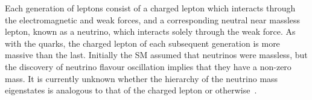 Each generation of leptons consist of a charged lepton which interacts through the electromagnetic and weak forces, and a corresponding neutral near massless lepton, known as a neutrino, which interacts solely through the weak force.
As with the quarks, the charged lepton of each subsequent generation is more massive than the last.
Initially the SM assumed that neutrinos were massless, but the discovery of neutrino flavour oscillation implies that they have a non-zero mass. 
It is currently unknown whether the hierarchy of the neutrino mass eigenstates is analogous to that of the charged lepton or otherwise~\cite{Nath:2018rqn}.

\begin{table}[htbp]
\label{tab:fermions}
  \centering
\end{table}


